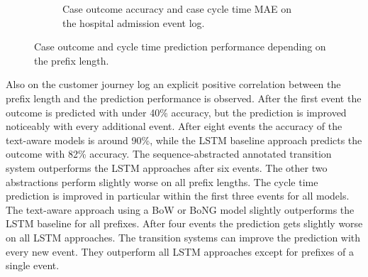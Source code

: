 \begin{figure}[!htbp]
\begin{subfigure}{\textwidth}
		\caption{Case outcome accuracy and case cycle time MAE on the hospital admission event log.}
	\end{subfigure}
	\caption[Case outcome and cycle time prediction performance depending on the prefix length]{Case outcome and cycle time prediction performance depending on the prefix length.}
	\label{fig:outcome-cycle-time-prefix}
\end{figure}


Also on the customer journey log an explicit positive correlation between the prefix length and the prediction performance is observed.
After the first event the outcome is predicted with under 40\% accuracy, but the prediction is improved noticeably with every additional event.
After eight events the accuracy of the text-aware models is around 90\%, while the LSTM baseline approach predicts the outcome with 82\% accuracy.
The sequence-abstracted annotated transition system outperforms the LSTM approaches after six events.
The other two abstractions perform slightly worse on all prefix lengths.
The cycle time prediction is improved in particular within the first three events for all models.
The text-aware approach using a BoW or BoNG model slightly outperforms the LSTM baseline for all prefixes.
After four events the prediction gets slightly worse on all LSTM approaches.
The transition systems can improve the prediction with every new event.
They outperform all LSTM approaches except for prefixes of a single event.

